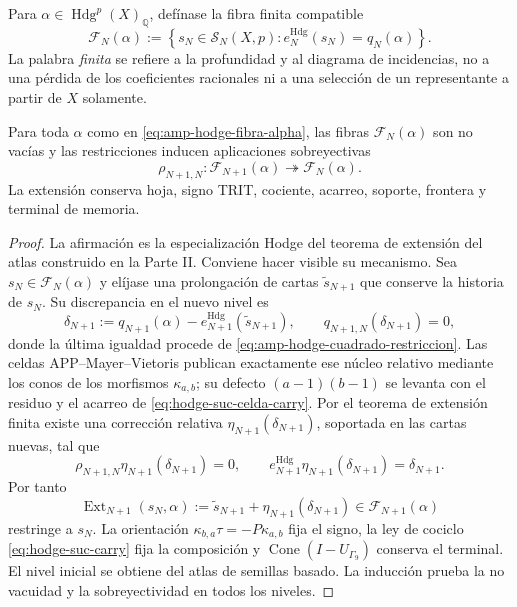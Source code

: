 Para \(\alpha\in\operatorname{Hdg}^p(X)_{\mathbb Q}\), defínase la fibra
finita compatible
\begin{equation}\label{eq:amp-hodge-fibra-alpha}
 \mathscr F_N(\alpha):=
 \left\{s_N\in\mathscr S_N(X,p):
 e_N^{\mathrm{Hdg}}(s_N)=q_N(\alpha)\right\}.
\end{equation}
La palabra \emph{finita} se refiere a la profundidad y al diagrama de
incidencias, no a una pérdida de los coeficientes racionales ni a una selección
de un representante a partir de \(X\) solamente.

\begin{proposition}
\label{prop:amp-hodge-extension-finita}
Para toda \(\alpha\) como en \eqref{eq:amp-hodge-fibra-alpha}, las fibras
\(\mathscr F_N(\alpha)\) son no vacías y las restricciones inducen aplicaciones
sobreyectivas
\begin{equation}\label{eq:amp-hodge-mittag-leffler}
 \rho_{N+1,N}:\mathscr F_{N+1}(\alpha)\twoheadrightarrow
 \mathscr F_N(\alpha).
\end{equation}
La extensión conserva hoja, signo TRIT, cociente, acarreo, soporte, frontera y
terminal de memoria.
\end{proposition}

\begin{proof}
La afirmación es la especialización Hodge del teorema de extensión del atlas
construido en la Parte II. Conviene hacer visible su mecanismo. Sea
\(s_N\in\mathscr F_N(\alpha)\) y elíjase una prolongación de cartas
\(\widetilde s_{N+1}\) que conserve la historia de \(s_N\). Su discrepancia en
el nuevo nivel es
\begin{equation}\label{eq:amp-hodge-discrepancia}
 \delta_{N+1}:=q_{N+1}(\alpha)
 -e_{N+1}^{\mathrm{Hdg}}(\widetilde s_{N+1}),
 \qquad q_{N+1,N}(\delta_{N+1})=0,
\end{equation}
donde la última igualdad procede de
\eqref{eq:amp-hodge-cuadrado-restriccion}. Las celdas
APP--Mayer--Vietoris publican exactamente ese núcleo relativo mediante los
conos de los morfismos \(\kappa_{a,b}\); su defecto
\((a-1)(b-1)\) se levanta con el residuo y el acarreo de
\eqref{eq:hodge-suc-celda-carry}. Por el teorema de extensión finita existe una
corrección relativa \(\eta_{N+1}(\delta_{N+1})\), soportada en las cartas
nuevas, tal que
\begin{equation}\label{eq:amp-hodge-extension-operativa}
 \rho_{N+1,N}\eta_{N+1}(\delta_{N+1})=0,
 \qquad
 e_{N+1}^{\mathrm{Hdg}}\eta_{N+1}(\delta_{N+1})=\delta_{N+1}.
\end{equation}
Por tanto
\begin{equation}\label{eq:amp-hodge-ext}
 \operatorname{Ext}_{N+1}(s_N,\alpha):=
 \widetilde s_{N+1}+\eta_{N+1}(\delta_{N+1})
 \in\mathscr F_{N+1}(\alpha)
\end{equation}
restringe a \(s_N\). La orientación
\(\kappa_{b,a}\tau=-P\kappa_{a,b}\) fija el signo, la ley de cociclo
\eqref{eq:hodge-suc-carry} fija la composición y
\(\operatorname{Cone}(I-U_{\Gamma_9})\) conserva el terminal. El nivel inicial
se obtiene del atlas de semillas basado. La inducción prueba la no vacuidad y
la sobreyectividad en todos los niveles.
\end{proof}

